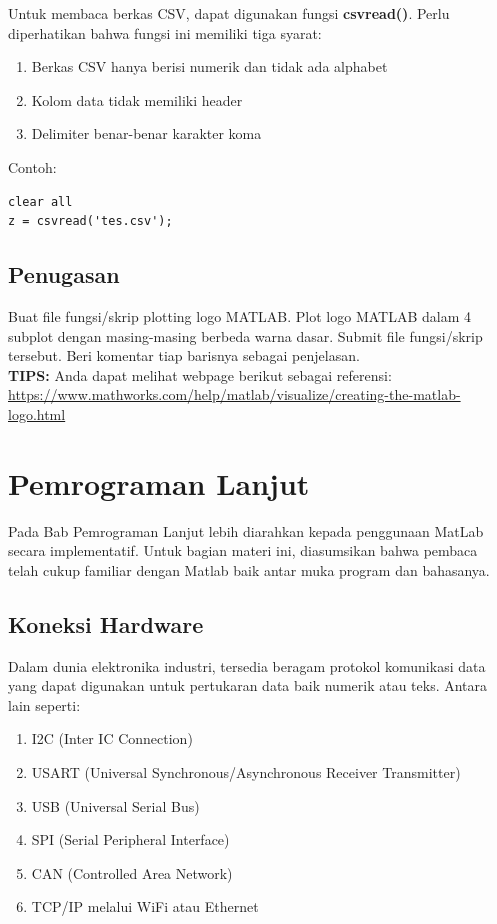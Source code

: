 \documentclass[12pt]{book}
\begin{document}
	Untuk membaca berkas CSV, dapat digunakan fungsi \textbf{csvread()}.
	Perlu diperhatikan bahwa fungsi ini memiliki tiga syarat:
	\begin{enumerate}
		\item Berkas CSV hanya berisi numerik dan tidak ada alphabet
		\item Kolom data tidak memiliki header
		\item Delimiter benar-benar karakter koma
	\end{enumerate}
	Contoh:
	\begin{verbatim}
clear all
z = csvread('tes.csv');
	\end{verbatim}
	
	\newpage
	\section{Penugasan}
	
	Buat file fungsi/skrip plotting logo MATLAB.
	Plot logo MATLAB dalam 4 subplot dengan masing-masing berbeda warna dasar.
	Submit file fungsi/skrip tersebut.
	Beri komentar tiap barisnya sebagai penjelasan.\\
	
	\textbf{TIPS:} Anda dapat melihat webpage berikut sebagai referensi:\\
	\url{https://www.mathworks.com/help/matlab/visualize/creating-the-matlab-logo.html}
	
	\newpage
	\chapter{Pemrograman Lanjut}
	
	Pada Bab Pemrograman Lanjut lebih diarahkan kepada penggunaan MatLab secara implementatif.
	Untuk bagian materi ini, diasumsikan bahwa pembaca telah cukup familiar dengan Matlab baik antar muka program dan bahasanya.
	
	\section{Koneksi Hardware}
	
	Dalam dunia elektronika industri, tersedia beragam protokol komunikasi data yang dapat digunakan untuk pertukaran data baik numerik atau teks.
	Antara lain seperti:
	\begin{enumerate}
		\item I2C (Inter IC Connection)
		\item USART (Universal Synchronous/Asynchronous Receiver Transmitter)
		\item USB (Universal Serial Bus)
		\item SPI (Serial Peripheral Interface)
		\item CAN (Controlled Area Network)
		\item TCP/IP melalui WiFi atau Ethernet
	\end{enumerate}
\end{document}
